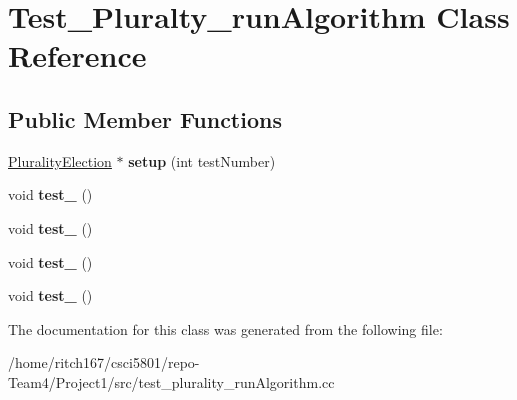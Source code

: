 \hypertarget{classTest__Pluralty__runAlgorithm}{}\section{Test\+\_\+\+Pluralty\+\_\+run\+Algorithm Class Reference}
\label{classTest__Pluralty__runAlgorithm}
\subsection*{Public Member Functions}
\begin{DoxyCompactItemize}
\item 
\mbox{\label{classTest__Pluralty__runAlgorithm_ad1c3955990cf8362ba824f825941d7c7}} 
\hyperlink{classPluralityElection}{Plurality\+Election} $\ast$ {\bfseries setup} (int test\+Number)
\item 
\mbox{\label{classTest__Pluralty__runAlgorithm_a34c7bf28d090a79fde11a0e48691d09f}} 
void {\bfseries test\+\_} ()
\item 
\mbox{\label{classTest__Pluralty__runAlgorithm_a0a6737334f76b13ca9429e6286dd7052}} 
void {\bfseries test\+\_} ()
\item 
\mbox{\label{classTest__Pluralty__runAlgorithm_ab7067e91a45d33c18e3bb39eb88cc980}} 
void {\bfseries test\+\_} ()
\item 
\mbox{\label{classTest__Pluralty__runAlgorithm_a034e8be72cce903aed34a30caf237536}} 
void {\bfseries test\+\_} ()
\end{DoxyCompactItemize}


The documentation for this class was generated from the following file\+:\begin{DoxyCompactItemize}
\item 
/home/ritch167/csci5801/repo-\/\+Team4/\+Project1/src/test\+\_\+plurality\+\_\+run\+Algorithm.\+cc\end{DoxyCompactItemize}
